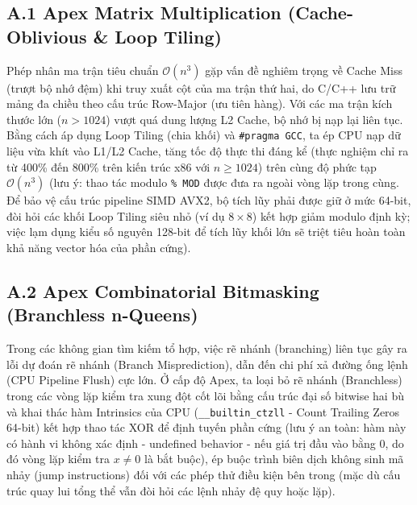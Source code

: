 \documentclass{article}
\begin{document}
\subsection*{A.1 Apex Matrix Multiplication (Cache-Oblivious \& Loop Tiling)}
Phép nhân ma trận tiêu chuẩn $\mathcal{O}(n^3)$ gặp vấn đề nghiêm trọng về Cache Miss (trượt bộ nhớ đệm) khi truy xuất cột của ma trận thứ hai, do C/C++ lưu trữ mảng đa chiều theo cấu trúc Row-Major (ưu tiên hàng). Với các ma trận kích thước lớn ($n > 1024$) vượt quá dung lượng L2 Cache, bộ nhớ bị nạp lại liên tục. Bằng cách áp dụng Loop Tiling (chia khối) và \verb|#pragma GCC|, ta ép CPU nạp dữ liệu vừa khít vào L1/L2 Cache, tăng tốc độ thực thi đáng kể (thực nghiệm chỉ ra từ 400\% đến 800\% trên kiến trúc x86 với $n \ge 1024$) trên cùng độ phức tạp $\mathcal{O}(n^3)$ (lưu ý: thao tác modulo \verb|% MOD| được đưa ra ngoài vòng lặp trong cùng. Để bảo vệ cấu trúc pipeline SIMD AVX2, bộ tích lũy phải được giữ ở mức 64-bit, đòi hỏi các khối Loop Tiling siêu nhỏ (ví dụ $8 \times 8$) kết hợp giảm modulo định kỳ; việc lạm dụng kiểu số nguyên 128-bit để tích lũy khối lớn sẽ triệt tiêu hoàn toàn khả năng vector hóa của phần cứng).



\subsection*{A.2 Apex Combinatorial Bitmasking (Branchless n-Queens)}
Trong các không gian tìm kiếm tổ hợp, việc rẽ nhánh (branching) liên tục gây ra lỗi dự đoán rẽ nhánh (Branch Misprediction), dẫn đến chi phí xả đường ống lệnh (CPU Pipeline Flush) cực lớn. Ở cấp độ Apex, ta loại bỏ rẽ nhánh (Branchless) trong các vòng lặp kiểm tra xung đột cốt lõi bằng cấu trúc đại số bitwise hai bù và khai thác hàm Intrinsics của CPU (\verb|__builtin_ctzll| - Count Trailing Zeros 64-bit) kết hợp thao tác XOR để định tuyến phần cứng (lưu ý an toàn: hàm này có hành vi không xác định - undefined behavior - nếu giá trị đầu vào bằng 0, do đó vòng lặp kiểm tra $x \neq 0$ là bắt buộc), ép buộc trình biên dịch không sinh mã nhảy (jump instructions) đối với các phép thử điều kiện bên trong (mặc dù cấu trúc quay lui tổng thể vẫn đòi hỏi các lệnh nhảy đệ quy hoặc lặp).


\end{document}
